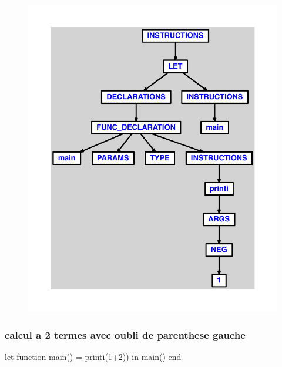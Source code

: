 \documentclass{article}
\begin{document}
\begin{figure}[H]\centering\includegraphics[max width=\textwidth]{ast/ast_26.pdf}\end{figure}\subsubsection{calcul a 2 termes avec oubli de parenthese gauche}
\begin{verbatimtab}
let function main() = printi(1+2)) in main() end
\end{verbatimtab}
\end{document}
